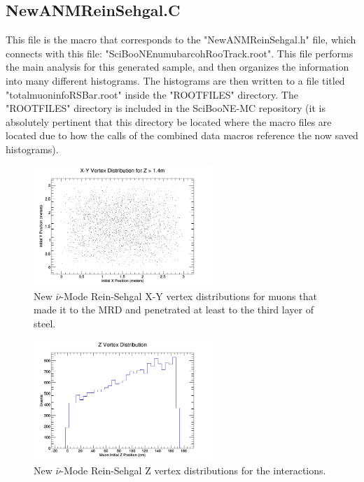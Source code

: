 \documentclass[11pt]{article}
\begin{document}
\subsection{NewANMReinSehgal.C}
This file is the macro that corresponds to the "NewANMReinSehgal.h" file, which connects with this file: "SciBooNE\textunderscore numubar\textunderscore coh\textunderscore RooTrack.root". This file performs the main analysis for this generated sample, and then organizes the information into many different histograms. The histograms are then written to a file titled "totalmuoninfoRSBar.root" inside the "ROOTFILES" directory. The "ROOTFILES" directory is included in the SciBooNE-MC repository (it is absolutely pertinent that this directory be located where the macro files are located due to how the calls of the combined data macros reference the now saved histograms).

\begin{figure}[H]
\centering
\includegraphics[width=0.6\textwidth]{NewANMReinSehgalImages/1-X-YVertexDistributionANMRS.png}
\caption{New $\bar{\nu}$-Mode Rein-Sehgal X-Y vertex distributions for muons that made it to the MRD and penetrated at least to the third layer of steel.}
\end{figure}

\begin{figure}[H]
\centering
\includegraphics[width=0.6\textwidth]{NewANMReinSehgalImages/2-ZVertexDistributionANMRS.png}
\caption{New $\bar{\nu}$-Mode Rein-Sehgal Z vertex distributions for the interactions.}
\end{figure}
\end{document}
